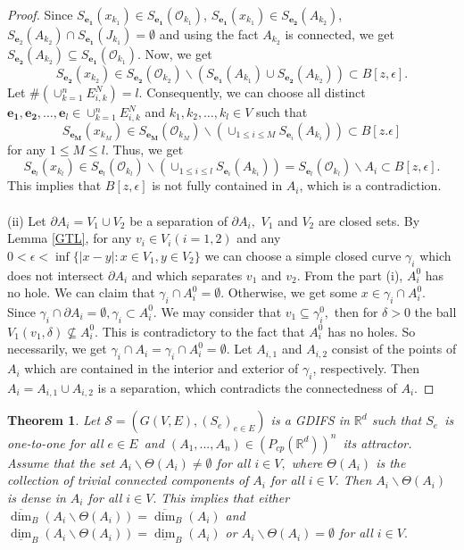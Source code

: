\documentclass[a4paper,12pt,reqno]{amsart}
\numberwithin{equation}{section}
\newtheorem{theorem}{Theorem}[section]
\theoremstyle{definition}
\theoremstyle{remark}
\numberwithin{equation}{section}
\begin{document}
\begin{proof}
    Since $S_{\mathbf{e_1}}(x_{k_1})\in S_{\mathbf{e_1}}(\mathcal{O}_{k_1})$, $S_{\mathbf{e_1}}(x_{k_1})\in S_{\mathbf{e_2}}(A_{k_2})$, $S_{\mathbf{e}_2}(A_{k_2}) \cap S_{\mathbf{e_1}}(J_{k_1})=\emptyset$ and using the fact $A_{k_2}$ is connected, we get $S_{\mathbf{e_2}}(A_{k_2})\subseteq  S_{\mathbf{e_1}}(\mathcal{O}_{k_1}).$ Now, we get $$S_{\mathbf{e_2}}(x_{k_2}) \in S_{\mathbf{e_2}}(\mathcal{O}_{k_2}) \backslash (S_{\mathbf{e_1}}(A_{k_1})\cup S_{\mathbf{e_2}}(A_{k_2}) )  \subset B[z,\epsilon].$$ Let $ \#(\cup_{k=1}^n E_{i,k}^N)=l.$ Consequently, we can choose all distinct $\mathbf{e_1},\mathbf{e_2},\dots,\mathbf{e}_l \in \cup_{k=1}^n E_{i,k}^N$ and $k_{1},k_{2},\dots,k_{l}\in V$ such that 
    $$ S_{\mathbf{e_M}}(x_{k_M}) \in S_{\mathbf{e_{M}}}(\mathcal{O}_{k_M})\backslash (\cup_{1 \le i \le M} S_{\mathbf{e}_i}(A_{k_i})) \subset B[z.\epsilon]$$
    for any $1 \le M \le l.$ Thus, we get 
    $$S_{\mathbf{e}_l}(x_{k_l}) \in S_{\mathbf{e}_l} (\mathcal{O}_{k_l}) \backslash (\cup_{1 \le i \le l} S_{\mathbf{e}_i}(A_{k_i})) = S_{\mathbf{e}_l} (\mathcal{O}_{k_l}) \backslash A_i  \subset B[z,\epsilon].$$ This implies that $B[z,\epsilon]$ is not fully contained in $A_i$, which is a contradiction.\\\\
    (ii) Let $\partial A_i=V_1 \cup V_2$ be a separation of $\partial A_i,$ $V_1$ and $V_2$ are closed sets. By Lemma \ref{GTL}, for any $v_i  \in V_i (i=1,2)$  and any $0<\epsilon < \inf \{|x-y|: x\in V_1, y \in V_2\}$ we can choose a simple closed curve $\gamma_i$ which does not intersect $\partial A_i$ and which separates $v_1$ and $v_2.$ From the part (i), $A_i^0$ has no hole. We can claim that $\gamma_i \cap A_i^0=\emptyset$. Otherwise, we get some $x \in \gamma_i \cap A_i^0$.\\ Since $\gamma_i \cap \partial A_i=\emptyset, \gamma_i \subset A_i^0.$ We may consider that $v_1 \subseteq \gamma_i^0,$ then for $\delta>0$ the ball $V_1(v_1,\delta) \nsubseteq A_i^0$. This is contradictory to the fact that $A_i^0$ has no holes. So necessarily, we get $\gamma_i \cap A_i=\gamma_i \cap A_i^0=\emptyset.$ Let $A_{i,1}$ and $A_{i,2}$ consist of the points of $A_i$ which are contained in the interior and exterior of $\gamma_i$, respectively. Then $A_i=A_{i,1} \cup A_{i,2}$ is a separation, which contradicts the connectedness of $A_i.$ 
\end{proof}
   \begin{theorem}\label{TH2.2}
    \textit{Let} $\mathcal{S}=(G(V,E),(S_{e})_{e\in E})$
\textit{is a GDIFS in} $\mathbb{R}^{d}$ \textit{such that }$%
S_{e}$\textit{\ is one-to-one for all }$e\in E$\textit{\ and }$%
(A_{1},...,A_{n})\in (P_{cp}(\mathbb{R}^{d}))^{n}$\textit{\ its attractor.}
     Assume that the set $A_i \backslash \Theta (A_i) \neq \emptyset$ for all $i\in V,$ where $\Theta (A_i)$ is the collection of trivial connected components of $A_i$ for all $i\in V.$ Then $A_i \backslash \Theta (A_i)$ is dense in $A_i$ for all $i\in V.$ This implies that either $\overline{\dim}_B (A_i \backslash \Theta (A_i))=\overline{\dim}_B (A_i)$ and $\underline{\dim}_B (A_i \backslash \Theta (A_i))=\underline{\dim}_B (A_i)$ or $A_i \backslash \Theta (A_i) = \emptyset$ for all $i\in V.$
\end{theorem}
\end{document}
